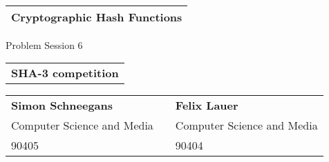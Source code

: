 \thispagestyle{empty}
\ \\[3cm]
\begin{tabular}[b]{l}
    \Huge \textbf{Cryptographic Hash Functions} \hspace{12.5cm} \\[1mm]
    \hline
\end{tabular}

\begin{flushright}
    {\large Problem Session 6} \\[8cm]
\end{flushright}

\begin{tabular}[b]{l}
    \LARGE \textbf{SHA-3 competition} \\[4cm]
\end{tabular}

\begin{tabular}{lcl}
    \textbf{Simon Schneegans} &\hspace{1cm} & \textbf{Felix Lauer} \\
    Computer Science and Media & \hspace{1cm}  & Computer Science and Media\\
    90405  &\hspace{1cm} & 90404 \\[1.5cm]
\end{tabular}

\newpage

